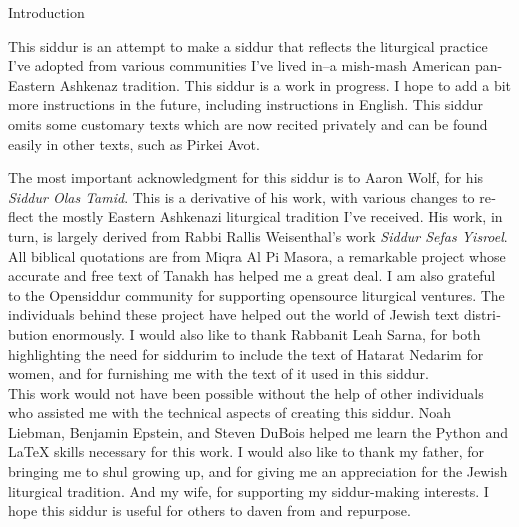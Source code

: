 \documentclass[twoside, openany, parskip=half, 11pt]{book}
\begin{document}
\begin{minipage}{\textwidth}

\begin{english}
\begin{center} %
\begin{LARGE}
Introduction
\end{LARGE}
\end{center}

This siddur is an attempt to make a siddur that reflects the liturgical practice I've adopted from various communities I've lived in--a mish-mash American pan-Eastern Ashkenaz tradition. This siddur is a work in progress. I hope to add a bit more instructions in the future, including instructions in English.  This siddur omits some customary texts which are now recited privately and can be found easily in other texts, such as Pirkei Avot.

The most important acknowledgment for this siddur is to Aaron Wolf, for his \textit{Siddur Olas Tamid}. This is a derivative of his work, with various changes to reflect the mostly Eastern Ashkenazi liturgical tradition I've received. His work, in turn, is largely derived from Rabbi Rallis Weisenthal's work \textit{Siddur Sefas Yisroel}. All biblical quotations are from Miqra Al Pi Masora, a remarkable project whose accurate and free text of Tanakh has helped me a great deal. I am also grateful to the Opensiddur community for supporting opensource liturgical ventures. The individuals behind these project have helped out the world of Jewish text distribution enormously. I would also like to thank Rabbanit Leah Sarna, for both highlighting the need for siddurim to include the text of Hatarat Nedarim for women, and for furnishing me with the text of it used in this siddur.\\

This work would not have been possible without the help of other individuals who assisted me with the technical aspects of creating this siddur. Noah Liebman, Benjamin Epstein, and Steven DuBois helped me learn the Python and \LaTeX{} skills necessary for this work. I would also like to thank my father, for bringing me to shul growing up, and for giving me an appreciation for the Jewish liturgical tradition. And my wife, for supporting my siddur-making interests. I hope this siddur is useful for others to daven from and repurpose.

\end{english}

\end{minipage}
\end{document}
